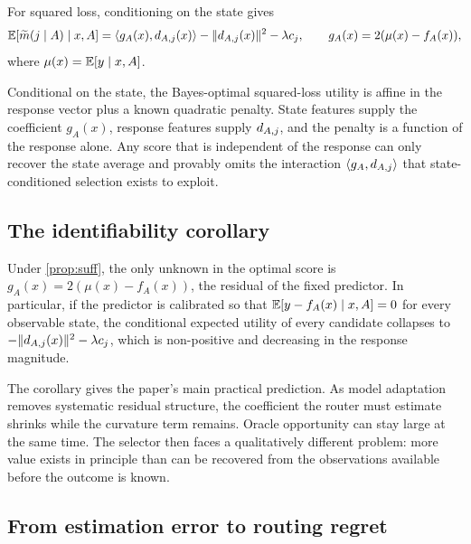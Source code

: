 \begin{proposition}
\label{prop:suff}
For squared loss, conditioning on the state gives
\begin{equation}
 \mathbb{E}\!\left[\widetilde{m}(j\mid A)\mid x,A\right]
 =
 \langle g_A(x),d_{A,j}(x)\rangle-\|d_{A,j}(x)\|^2-\lambda c_j,
 \qquad
 g_A(x)=2(\mu(x)-f_A(x)),
 \label{eq:prop-suff}
\end{equation}
where $\mu(x)=\mathbb{E}[y\mid x,A]$.
\end{proposition}

Conditional on the state, the Bayes-optimal squared-loss utility is affine in
the response vector plus a known quadratic penalty. State features supply the
coefficient $g_A(x)$, response features supply $d_{A,j}$, and the penalty is a
function of the response alone. Any score that is independent of the response
can only recover the state average and provably omits the interaction
$\langle g_A,d_{A,j}\rangle$ that state-conditioned selection exists to exploit.

\subsection{The identifiability corollary}

\begin{corollary}
\label{cor:identifiability}
Under \cref{prop:suff}, the only unknown in the optimal score is
$g_A(x)=2(\mu(x)-f_A(x))$, the residual of the fixed predictor. In particular,
if the predictor is calibrated so that $\mathbb{E}[y-f_A(x)\mid x,A]=0$ for every
observable state, the conditional expected utility of every candidate collapses
to $-\|d_{A,j}(x)\|^2-\lambda c_j$, which is non-positive and decreasing in the
response magnitude.
\end{corollary}

The corollary gives the paper's main practical prediction. As model adaptation
removes systematic residual structure, the coefficient the router must estimate
shrinks while the curvature term remains. Oracle opportunity can stay large at
the same time. The selector then faces a qualitatively different problem: more
value exists in principle than can be recovered from the observations available
before the outcome is known.

\subsection{From estimation error to routing regret}

